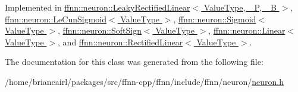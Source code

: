 Implemented in \hyperlink{classffnn_1_1neuron_1_1_leaky_rectified_linear_a219673d306064ae1405dd9385f031380}{ffnn\-::neuron\-::\-Leaky\-Rectified\-Linear$<$ Value\-Type, \-\_\-\-P, \-\_\-\-B $>$}, \hyperlink{classffnn_1_1neuron_1_1_le_cun_sigmoid_ae1a0a4b086a8983f31fb320e7c3088dc}{ffnn\-::neuron\-::\-Le\-Cun\-Sigmoid$<$ Value\-Type $>$}, \hyperlink{classffnn_1_1neuron_1_1_sigmoid_a1176976ca74341daac6c1720f7056d39}{ffnn\-::neuron\-::\-Sigmoid$<$ Value\-Type $>$}, \hyperlink{classffnn_1_1neuron_1_1_soft_sign_a1d3ecb32d2eeea06b988ef4f779303e0}{ffnn\-::neuron\-::\-Soft\-Sign$<$ Value\-Type $>$}, \hyperlink{classffnn_1_1neuron_1_1_linear_aa59814449ab3e63d2cbd4f01fd500044}{ffnn\-::neuron\-::\-Linear$<$ Value\-Type $>$}, and \hyperlink{classffnn_1_1neuron_1_1_rectified_linear_a11584934d68646ccced2c0c1c382960d}{ffnn\-::neuron\-::\-Rectified\-Linear$<$ Value\-Type $>$}.



The documentation for this class was generated from the following file\-:\begin{DoxyCompactItemize}
\item 
/home/briancairl/packages/src/ffnn-\/cpp/ffnn/include/ffnn/neuron/\hyperlink{neuron_8h}{neuron.\-h}\end{DoxyCompactItemize}
